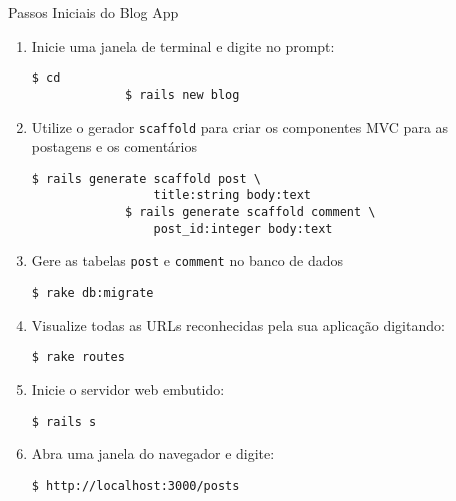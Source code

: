 \begin{frame}{Passos Iniciais do Blog App}
	\begin{enumerate}
	    \item Inicie uma janela de terminal e digite no prompt:
	     \begin{lstlisting}[style=BashInputBasicStyle]
		     $ cd 
		     $ rails new blog
	     \end{lstlisting}
	    \item Utilize o gerador \verb|scaffold| para criar os 
	    componentes MVC para as postagens e os comentários
	     \begin{lstlisting}[style=BashInputBasicStyle]
		     $ rails generate scaffold post \ 
			     title:string body:text
		     $ rails generate scaffold comment \
			     post_id:integer body:text
	     \end{lstlisting}
	    \item Gere as tabelas \verb|post| e \verb|comment| no banco de dados
	    \begin{lstlisting}[style=BashInputBasicStyle]
		    $ rake db:migrate
	    \end{lstlisting}
	    
	    \item Visualize todas as URLs reconhecidas pela sua aplicação digitando:
	    \begin{lstlisting}[style=BashInputBasicStyle]
	    $ rake routes
	    \end{lstlisting}
	     \item Inicie o servidor web embutido:
	     \begin{lstlisting}[style=BashInputBasicStyle]
	     $ rails s
	     \end{lstlisting}
	     
	     \item Abra uma janela do navegador e digite:
	     \begin{lstlisting}[style=BashInputBasicStyle]
	     $ http://localhost:3000/posts
	     \end{lstlisting}
	\end{enumerate}
  
\end{frame}